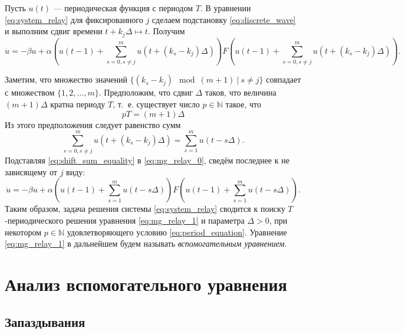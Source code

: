 Пусть $u(t)$ --- периодическая функция с периодом $T$. В уравнении \eqref{eq:system_relay} для фиксированного $j$ сделаем подстановку \eqref{eq:discrete_wave} и выполним сдвиг времени $t + k_j \Delta \mapsto t$. Получим
%
\small
\begin{equation}
	\label{eq:mg_relay_0}
	\dot{u} = -\beta u+\alpha\left(u(t-1)+ \sum_{s=0,s\neq j}^{m}u(t+(k_s-k_j)\Delta)\right)F\left(u(t-1)+ \sum_{s=0, s\neq j}^{m}u(t+(k_s-k_j)\Delta)\right).
\end{equation}
\normalsize

Заметим, что множество значений $\{(k_s - k_j) \mod (m + 1) \ | \ s \neq j\}$ совпадает с множеством $\{1, 2, \ldots, m\}$. Предположим, что сдвиг $\Delta$ таков, что величина $(m + 1) \Delta$ кратна периоду $T$, т.~е. существует число $p \in \mathbb{N}$ такое, что
%
\begin{equation}
	\label{eq:period_equation}
	pT = (m + 1)\Delta
\end{equation}
%
Из этого предположения следует равенство сумм
%
\begin{equation}
	\label{eq:shift_sum_equality}
	\sum\limits_{s=0, s\neq j}^{m}u(t+(k_s-k_j)\Delta)=\sum\limits_{s=1}^{m}u(t-s\Delta).
\end{equation}
%
Подставляя \eqref{eq:shift_sum_equality} в \eqref{eq:mg_relay_0}, сведём последнее к не зависящему от $j$ виду:
%
\small
\begin{equation}
	\label{eq:mg_relay_1}
	\dot{u}=-\beta u+\alpha\left(u(t-1)+ \sum_{s=1}^{m}u(t-s\Delta)\right)F\left(u(t-1)+ \sum_{s=1}^{m}u(t-s\Delta)\right).
\end{equation}
\normalsize
%
Таким образом, задача решения системы \eqref{eq:system_relay} сводится к поиску $T$-периодического решения уравнения \eqref{eq:mg_relay_1} и параметра $\Delta > 0$, при некотором $p \in \mathbb{N}$ удовлетворяющего условию \eqref{eq:period_equation}. Уравнение \eqref{eq:mg_relay_1} в дальнейшем будем называть \emph{вспомогательным уравнением}.

\section{Анализ вспомогательного уравнения}\label{sec:ch2/sect2}

\subsection{Запаздывания}

